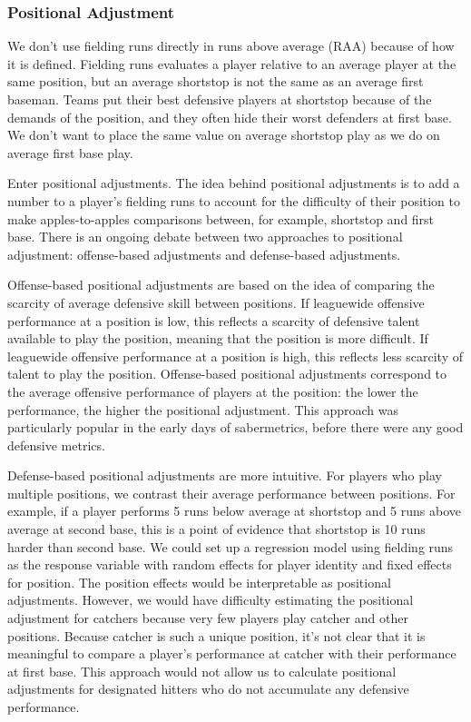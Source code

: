 \documentclass{article}
\begin{document}
      \subsubsection{\sc Positional Adjustment}

        We don't use fielding runs directly in runs above average (RAA) because of how it is defined. Fielding runs evaluates a player relative to an average player at the same position, but an average shortstop is not the same as an average first baseman. Teams put their best defensive players at shortstop because of the demands of the position, and they often hide their worst defenders at first base. We don't want to place the same value on average shortstop play as we do on average first base play.

        Enter positional adjustments. The idea behind positional adjustments is to add a number to a player's fielding runs to account for the difficulty of their position to make apples-to-apples comparisons between, for example, shortstop and first base. There is an ongoing debate between two approaches to positional adjustment: offense-based adjustments and defense-based adjustments.

        Offense-based positional adjustments are based on the idea of comparing the scarcity of average defensive skill between positions. If leaguewide offensive performance at a position is low, this reflects a scarcity of defensive talent available to play the position, meaning that the position is more difficult. If leaguewide offensive performance at a position is high, this reflects less scarcity of talent to play the position. Offense-based positional adjustments correspond to the average offensive performance of players at the position: the lower the performance, the higher the positional adjustment. This approach was particularly popular in the early days of sabermetrics, before there were any good defensive metrics.

        Defense-based positional adjustments are more intuitive. For players who play multiple positions, we contrast their average performance between positions. For example, if a player performs 5 runs below average at shortstop and 5 runs above average at second base, this is a point of evidence that shortstop is 10 runs harder than second base. We could set up a regression model using fielding runs as the response variable with random effects for player identity and fixed effects for position. The position effects would be interpretable as positional adjustments. However, we would have difficulty estimating the positional adjustment for catchers because very few players play catcher and other positions. Because catcher is such a unique position, it's not clear that it is meaningful to compare a player's performance at catcher with their performance at first base. This approach would not allow us to calculate positional adjustments for designated hitters who do not accumulate any defensive performance.
\end{document}
